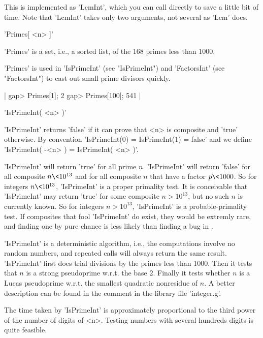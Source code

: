 This is implemented  as 'LcmInt', which  you can call directly to  save a
little bit of  time.  Note that 'LcmInt'  takes  only two arguments,  not
several as 'Lcm' does.

%

'Primes[ <n> ]'

'Primes' is a set, i.e., a sorted list, of the 168 primes less than 1000.

'Primes' is used in 'IsPrimeInt' (see "IsPrimeInt") and 'FactorsInt' (see
"FactorsInt") to cast out small prime divisors quickly.

|    gap> Primes[1];
    2
    gap> Primes[100];
    541 |

%

'IsPrimeInt( <n> )'

'IsPrimeInt' returns 'false'  if it can  prove that <n>  is composite and
'true' otherwise.  By  convention 'IsPrimeInt(0) = IsPrimeInt(1) = false'
and we define 'IsPrimeInt( -<n> ) = IsPrimeInt( <n> )'.

'IsPrimeInt' will return  'true' for all   prime $n$.  'IsPrimeInt'  will
return 'false' for all composite $n \< 10^{13}$ and for all composite $n$
that have   a factor  $p \<  1000$.   So for  integers $n    \< 10^{13}$,
'IsPrimeInt' is  a    proper primality test.    It  is  conceivable  that
'IsPrimeInt' may  return 'true' for some  composite $n > 10^{13}$, but no
such $n$ is currently known.  So for integers $n > 10^{13}$, 'IsPrimeInt'
is a  probable-primality test.  If composites  that fool  'IsPrimeInt' do
exist,  they would be  extremly rare, and finding one  by  pure chance is
less likely than finding a bug in {\GAP}.

'IsPrimeInt' is a deterministic algorithm, i.e., the computations involve
no random numbers, and repeated calls will always return the same result.
'IsPrimeInt' first   does trial divisions  by the  primes less than 1000.
Then it tests  that  $n$  is a   strong  pseudoprime w.r.t. the base   2.
Finally it  tests whether $n$ is  a Lucas pseudoprime w.r.t. the smallest
quadratic nonresidue of  $n$.  A better  description can be found in  the
comment in the library file 'integer.g'.

The time taken by 'IsPrimeInt' is approximately proportional to the third
power  of  the number  of  digits of <n>.   Testing numbers  with several
hundreds digits is quite feasible.

